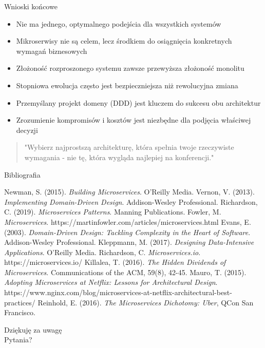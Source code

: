 \documentclass[aspectratio=169,xcolor=table]{beamer}
\begin{document}
\begin{frame}{Wnioski końcowe}
  \begin{itemize}
    \item Nie ma jednego, optymalnego podejścia dla wszystkich systemów
    \item Mikroserwisy nie są celem, lecz środkiem do osiągnięcia konkretnych wymagań biznesowych
    \item Złożoność rozproszonego systemu zawsze przewyższa złożoność monolitu
    \item Stopniowa ewolucja często jest bezpieczniejsza niż rewolucyjna zmiana
    \item Przemyślany projekt domeny (DDD) jest kluczem do sukcesu obu architektur
    \item Zrozumienie kompromisów i kosztów jest niezbędne dla podjęcia właściwej decyzji
  \end{itemize}
  
  \begin{quote}
    \centering
    "Wybierz najprostszą architekturę, która spełnia twoje rzeczywiste wymagania - nie tę, która wygląda najlepiej na konferencji."
  \end{quote}
\end{frame}

\begin{frame}[allowframebreaks]{Bibliografia}
  \footnotesize{
    \begin{thebibliography}{99}
       Newman, S. (2015). \textit{Building Microservices}. O'Reilly Media.
       Vernon, V. (2013). \textit{Implementing Domain-Driven Design}. Addison-Wesley Professional.
       Richardson, C. (2019). \textit{Microservices Patterns}. Manning Publications.
       Fowler, M. \textit{Microservices}. https://martinfowler.com/articles/microservices.html
       Evans, E. (2003). \textit{Domain-Driven Design: Tackling Complexity in the Heart of Software}. Addison-Wesley Professional.
       Kleppmann, M. (2017). \textit{Designing Data-Intensive Applications}. O'Reilly Media.
       Richardson, C. \textit{Microservices.io}. https://microservices.io/
       Killalea, T. (2016). \textit{The Hidden Dividends of Microservices}. Communications of the ACM, 59(8), 42-45.
       Mauro, T. (2015). \textit{Adopting Microservices at Netflix: Lessons for Architectural Design}. https://www.nginx.com/blog/microservices-at-netflix-architectural-best-practices/
       Reinhold, E. (2016). \textit{The Microservices Dichotomy: Uber}, QCon San Francisco.
    \end{thebibliography}
  }
\end{frame}

\begin{frame}
  \centering
  \Huge Dziękuję za uwagę\\
  \vspace{1cm}
  \Large Pytania?
\end{frame}
\end{document}
